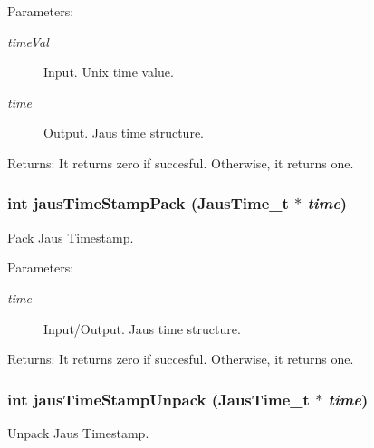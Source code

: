 \begin{Desc}
\item[Parameters:]
\begin{description}
\item[{\em timeVal}]Input. Unix time value. \item[{\em time}]Output. Jaus time structure.\end{description}
\end{Desc}
\begin{Desc}
\item[Returns:]It returns zero if succesful. Otherwise, it returns one. \end{Desc}
\hypertarget{group__time__conv_gefa61d2f15de88919f2c623b39edb394}{
\subsubsection[jausTimeStampPack]{\setlength{\rightskip}{0pt plus 5cm}int jausTimeStampPack ({\bf JausTime\_\-t} $\ast$ {\em time})}}
\label{group__time__conv_gefa61d2f15de88919f2c623b39edb394}


Pack Jaus Timestamp. 

\begin{Desc}
\item[Parameters:]
\begin{description}
\item[{\em time}]Input/Output. Jaus time structure.\end{description}
\end{Desc}
\begin{Desc}
\item[Returns:]It returns zero if succesful. Otherwise, it returns one. \end{Desc}
\hypertarget{group__time__conv_g32861ee818838c146b1a50bd18a1b443}{
\subsubsection[jausTimeStampUnpack]{\setlength{\rightskip}{0pt plus 5cm}int jausTimeStampUnpack ({\bf JausTime\_\-t} $\ast$ {\em time})}}
\label{group__time__conv_g32861ee818838c146b1a50bd18a1b443}


Unpack Jaus Timestamp. 

